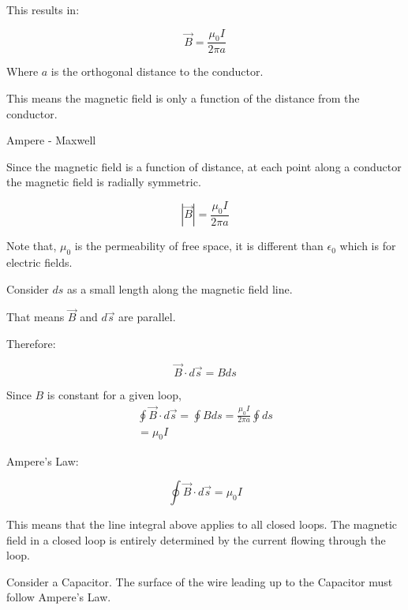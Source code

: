 \documentclass{report}
\begin{document}
\begin{description}
\begin{mdframed}
            This results in:

            \begin{displaymath}
                \vec{B} = \frac{\mu_0 I}{2\pi a}
            \end{displaymath}

            Where $a$ is the orthogonal distance to the conductor.
            
            This means the magnetic field is only a function of
            the distance from the conductor.
        \end{mdframed}
        \pagebreak
        {\large Ampere - Maxwell}
        \begin{mdframed}
           Since the magnetic field is a function of distance,
           at each point along a conductor the magnetic
           field is radially symmetric.

           \begin{displaymath}
               |\vec{B}| = \frac{\mu_0 I}{2\pi a}
           \end{displaymath}

           Note that, $\mu_0$ is the permeability of free
           space, it is different than $\epsilon_0$ which
           is for electric fields.

           Consider $ds$ as a small length along the magnetic
           field line. 

           That means $\vec{B}$ and $d\vec{s}$ are parallel.

           Therefore:

           \begin{displaymath}
                \vec{B} \cdot d\vec{s} = Bds
           \end{displaymath}
           
            Since $B$ is constant for a given loop,
             \begin{gather}
                 \oint \vec{B} \cdot d\vec{s} = \oint Bds = \frac{\mu_0 I}{2\pi a} \oint ds\\
                 = \mu_0 I
            \end{gather}

            Ampere's Law:

            \begin{displaymath}
                \oint \vec{B} \cdot d\vec{s} = \mu_0 I
            \end{displaymath}

            This means that the line integral above
            applies to all closed loops. The magnetic
            field in a closed loop is entirely determined by the
            current flowing through the loop.
        \end{mdframed}
        \begin{mdframed}
            Consider a Capacitor. The surface of the wire
            leading up to the Capacitor must follow
            Ampere's Law.


\end{mdframed}
\end{description}
\end{document}
